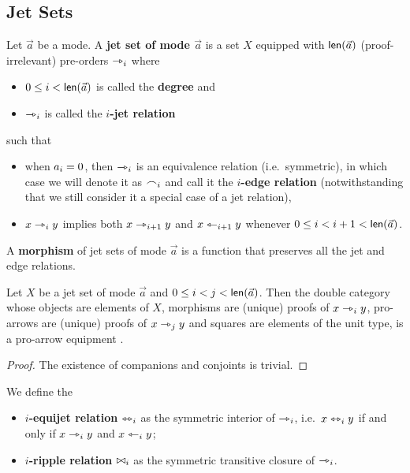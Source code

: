 \documentclass[a4paper]{article}
\begin{document}
\subsection{Jet Sets}
\begin{definition} \label{def:jetset}
	Let $\vec a$ be a mode. A \textbf{jet set of mode $\vec a$} is a set $X$ equipped with $\mathsf{len}(\vec a)$ (proof-irrelevant) pre-orders $\rightarrowtriangle_i$ where
	\begin{itemize}
		\item $0 \leq i < \mathsf{len}(\vec a)$ is called the \textbf{degree} and
		\item $\rightarrowtriangle_i$ is called the \textbf{$i$-jet relation}
	\end{itemize}
	such that
	\begin{itemize}
		\item when $a_i = 0$, then $\rightarrowtriangle_i$ is an equivalence relation (i.e.\ symmetric), in which case we will denote it as $\frown_i$ and call it the \textbf{$i$-edge relation} (notwithstanding that we still consider it a special case of a jet relation),
		\item $x \rightarrowtriangle_i y$ implies both $x \rightarrowtriangle_{i+1} y$ and $x \leftarrowtriangle_{i+1} y$ whenever $0 \leq i < i+1 < \mathsf{len}(\vec a)$.
	\end{itemize}
	A \textbf{morphism} of jet sets of mode $\vec a$ is a function that preserves all the jet and edge relations.
\end{definition}
\begin{proposition}
	Let $X$ be a jet set of mode $\vec a$ and $0 \leq i < j < \mathsf{len}(\vec a)$.
	Then the double category whose objects are elements of $X$, morphisms are (unique) proofs of $x \rightarrowtriangle_i y$, pro-arrows are (unique) proofs of $x \rightarrowtriangle_{j} y$ and squares are elements of the unit type, is a pro-arrow equipment \cite{nlab:proarrow,proarrow1,proarrow2}.
\end{proposition}
\begin{proof}
	The existence of companions and conjoints is trivial.
\end{proof}
\begin{definition}
	We define the
	\begin{itemize}
		\item \textbf{$i$-equijet relation} $\leftrightarrowtriangle_i$ as the symmetric interior of $\rightarrowtriangle_i$, i.e.\ $x \leftrightarrowtriangle_i y$ if and only if $x \rightarrowtriangle_i y$ and $x \leftarrowtriangle_i y$;
		\item \textbf{$i$-ripple relation} $\mathrel{\bowtie}_i$ as the symmetric transitive closure of $\rightarrowtriangle_i$.
	\end{itemize}
\end{definition}
\end{document}
